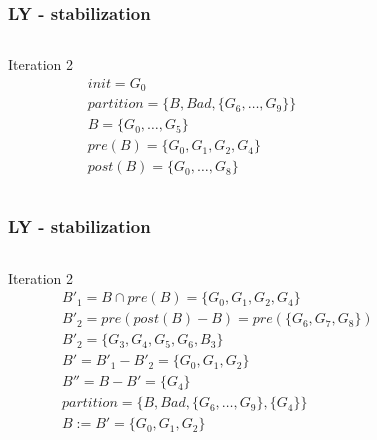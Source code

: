 \documentclass[11pt,handout]{beamer}
\begin{document}
\begin{frame}[fragile]
  \frametitle{LY - stabilization}
  \begin{columns}
    \begin{column}{0.5\textwidth}
      Iteration 2
      \begin{align*}
        & init = G_0 \\
        & partition = \{B,Bad,\{G_6,\dots,G_9\} \} \\
        & B = \{G_0,\dots,G_5\} \\
        & pre(B) = \{G_0,G_1,G_2,G_4\}\\
        & post(B) = \{G_0,\dots,G_8\}
      \end{align*}
    \end{column}
    \begin{column}{0.5\textwidth}%
      
    \end{column}
  \end{columns}
\end{frame}

\begin{frame}[fragile]
  \frametitle{LY - stabilization}
  \begin{columns}
    \begin{column}{0.5\textwidth}
      Iteration 2
      \begin{align*}
        & B'_1 = B \cap pre(B) = \{G_0,G_1,G_2,G_4\} \\
        & B'_2 = pre(post(B) - B) = pre(\{G_6,G_7,G_8\}) \\
        & B'_2 = \{G_3,G_4,G_5,G_6,B_3\} \\
        & B' = B'_1 - B'_2 = \{G_0,G_1,G_2\} \\
        & B'' = B - B' = \{G_4\} \\
        & partition = \{B,Bad,\{G_6,\dots,G_9\},\{G_4\}\} \\
        & B := B' = \{G_0,G_1,G_2\}
      \end{align*}
    \end{column}
    \begin{column}{0.5\textwidth}%
      
    \end{column}
  \end{columns}
\end{frame}
\end{document}
